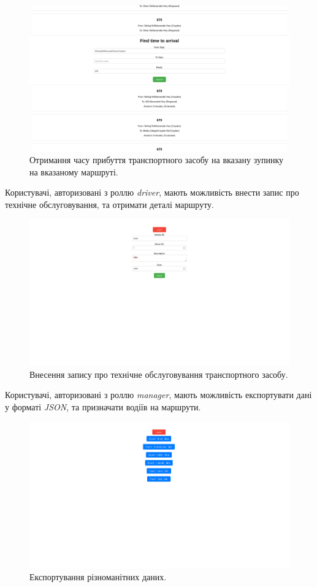 \documentclass[oneside,14pt]{extarticle}
\begin{document}
\begin{figure}[H]
\centering
\includegraphics[scale=0.25]{3}
\caption{Отримання часу прибуття транспортного засобу на вказану зупинку на вказаному маршруті.}
\end{figure}

Користувачі, авторизовані з роллю \textit{driver}, мають можливість внести запис про технічне обслуговування, та отримати деталі маршруту.

\begin{figure}[H]
\centering
\includegraphics[scale=0.25]{4}
\caption{Внесення запису про технічне обслуговування транспортного засобу.}
\end{figure}

Користувачі, авторизовані з роллю \textit{manager}, мають можливість експортувати дані у форматі \textit{JSON}, та призначати водіїв на маршрути.

\begin{figure}[H]
\centering
\includegraphics[scale=0.25]{5}
\caption{Експортування різноманітних даних.}
\end{figure}
\end{document}
